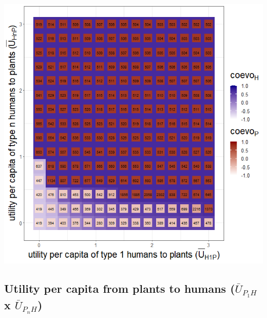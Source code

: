 \documentclass[
]{book}
\begin{document}
\includegraphics[width=1\linewidth]{plots/3_exp_utility_per_capita_type_humans_to_plants-tripleRaster_twoParameters}

\newpage

\hypertarget{utility-per-capita-from-plants-to-humans-baru_p_1h-x-baru_p_nh}{%
\subsection{\texorpdfstring{Utility per capita from plants to humans (\(\bar{U}_{P_{1}H}\) x \(\bar{U}_{P_{n}H}\))}{Utility per capita from plants to humans (\textbackslash bar\{U\}\_\{P\_\{1\}H\} x \textbackslash bar\{U\}\_\{P\_\{n\}H\})}}\label{utility-per-capita-from-plants-to-humans-baru_p_1h-x-baru_p_nh}}

\end{document}
